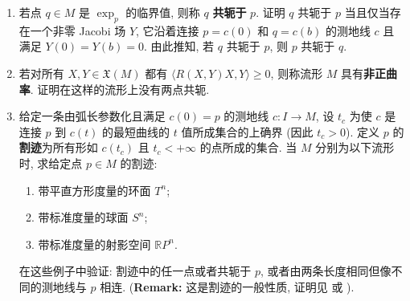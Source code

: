 \begin{RiemannExercise}
\begin{enumerate}[label=(\arabic*),ref=\arabic*,leftmargin=*]
\begin{enumerate}[label=(\alph*),leftmargin=*]
\[\]
则称它为 \textbf{Jacobi 场}. 证明 $Y$ 是满足 $Y(0)=0$ 的 Jacobi 场当且仅当
\[
  Y(t)=\left.\frac{\partial}{\partial s}\exp_p(tv(s))\right|_{s=0}
\]
其中 $v:(-\varepsilon,\varepsilon)\to T_pM$ 满足 $v(0)=\dot c(0)$.
\item 若点 $q\in M$ 是 $\exp_p$ 的临界值, 则称 $q$ \textbf{共轭于} $p$. 证明 $q$ 共轭于 $p$ 当且仅当存在一个非零 Jacobi 场 $Y$, 它沿着连接 $p=c(0)$ 和 $q=c(b)$ 的测地线 $c$ 且满足 $Y(0)=Y(b)=0$. 由此推知, 若 $q$ 共轭于 $p$, 则 $p$ 共轭于 $q$.
\item 若对所有 $X,Y\in\mathfrak{X}(M)$ 都有 $\langle R(X,Y)X,Y\rangle\geq0$, 则称流形 $M$ 具有\textbf{非正曲率}. 证明在这样的流形上没有两点共轭.
\item 给定一条由弧长参数化且满足 $c(0)=p$ 的测地线 $c:I\to M$, 设 $t_c$ 为使 $c$ 是连接 $p$ 到 $c(t)$ 的最短曲线的 $t$ 值所成集合的上确界 (因此 $t_c>0$). 定义 $p$ 的\textbf{割迹}为所有形如 $c(t_c)$ 且 $t_c<+\infty$ 的点所成的集合. 当 $M$ 分别为以下流形时, 求给定点 $p\in M$ 的割迹:
\begin{enumerate}[label=(\roman*),leftmargin=*]
\item 带平直方形度量的环面 $T^n$;
\item 带标准度量的球面 $S^n$;
\item 带标准度量的射影空间 $\mathbb{R}P^n$.
\end{enumerate}
在这些例子中验证: 割迹中的任一点或者共轭于 $p$, 或者由两条长度相同但像不同的测地线与 $p$ 相连.
{\small (\textbf{Remark:} 这是割迹的一般性质, 证明见  或 ).}
\end{enumerate}
\end{enumerate}
\end{RiemannExercise}
